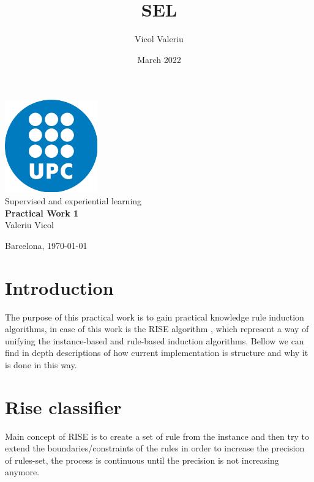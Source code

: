\documentclass{article}
\title{SEL}
\author{Vicol Valeriu}
\date{March 2022}
\begin{document}
% 

\DeclareRobustCommand{\mybox}[2][gray!20]{%
\begin{tcolorbox}[   %
        breakable,
        left=0pt,
        right=0pt,
        top=0pt,
        bottom=0pt,
        colback=#1,
        colframe=#1,
        width=\dimexpr\textwidth\relax, 
        enlarge left by=0mm,
        fontupper=\small, fontlower=\Large,
        boxsep=5pt,
        arc=0pt,outer arc=0pt,
        ]
        #2
\end{tcolorbox}
}


\begin{titlepage}
    \centering
   \sc \LARGE
   \vspace{3cm}
   \includegraphics[height=4cm,width=4cm]{media/logo.png}\\
   \vspace{1cm}
   Supervised and experiential learning\\ 

   \vfill
   \textbf{Practical Work 1}\\

   \vspace{2cm}
   \Large \vfill
   Valeriu Vicol 
   
   \vfill
 
  Barcelona, \today
\end{titlepage}
\thispagestyle{empty}
\tableofcontents
\vfill
\vspace{.75cm}
\setcounter{page}{1}
\newpage
\section{Introduction}
The purpose of this practical work is to gain practical knowledge  rule induction algorithms, in case of this work is the RISE
algorithm \cite{domingos1996unifying}, which represent a way of unifying the instance-based and rule-based induction
algorithms. Bellow we can find in depth descriptions of how current implementation is structure and why it is done in this way.
\section{Rise classifier}
Main concept of RISE is to create a set of rule from the instance and then try to extend the boundaries/constraints of the rules
in order to increase the precision of rules-set, the process is continuous until the precision is not increasing anymore.
\end{document}
